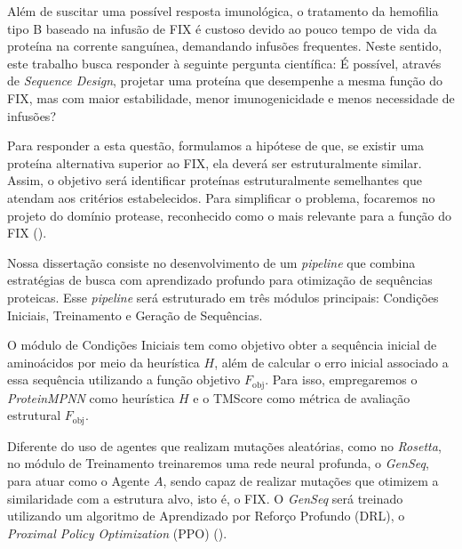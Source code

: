 \label{section:Proposta}

Além de suscitar uma possível resposta imunológica, 
o tratamento da hemofilia tipo B baseado na infusão de  FIX
é custoso devido ao pouco tempo de vida da proteína na corrente sanguínea, demandando infusões frequentes. 
Neste sentido, este trabalho busca responder à seguinte pergunta científica: 
É possível, através de \textit{Sequence Design}, projetar uma proteína que desempenhe a mesma função do FIX, 
mas com maior estabilidade, menor imunogenicidade e menos necessidade de infusões?

Para responder a esta questão, formulamos a hipótese de que, 
se existir uma proteína alternativa superior ao FIX, 
ela deverá ser estruturalmente similar. 
Assim, o objetivo será identificar proteínas estruturalmente semelhantes que atendam aos critérios estabelecidos.
Para simplificar o problema, focaremos no projeto do domínio protease, 
reconhecido como o mais relevante para a função do FIX (\cite{FIX}).

Nossa dissertação consiste no desenvolvimento de um \textit{pipeline} que combina estratégias de busca 
com aprendizado profundo para otimização de sequências proteicas. 
Esse \textit{pipeline} será estruturado em três módulos principais: Condições Iniciais, 
Treinamento e Geração de Sequências.


O módulo de Condições Iniciais tem como objetivo obter a sequência inicial de aminoácidos 
por meio da heurística \( H \), além de calcular o erro inicial associado a essa sequência 
utilizando a função objetivo \( F_{\text{obj}} \). 
Para isso, empregaremos o \textit{ProteinMPNN} como heurística \( H \) 
e o TMScore como métrica de avaliação estrutural \( F_{\text{obj}} \).  

Diferente do uso de agentes que realizam mutações aleatórias, como no \textit{Rosetta},
no módulo de Treinamento treinaremos uma rede neural profunda, o \textit{GenSeq}, para atuar como o Agente $A$,
sendo capaz de realizar mutações que otimizem a similaridade com a estrutura alvo, isto é, o FIX.
O \textit{GenSeq} será treinado utilizando um algoritmo de Aprendizado por Reforço Profundo (DRL), 
o \textit{Proximal Policy Optimization} (PPO) (\cite{PPO}).

